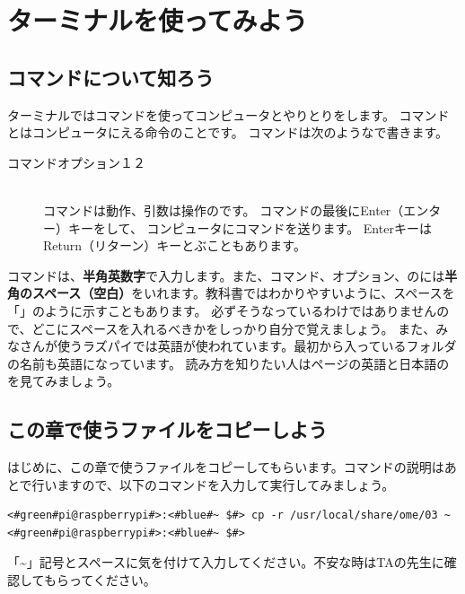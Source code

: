 \documentclass[text03.tex]{subfiles}
\begin{document}
\section{ターミナルを使ってみよう}
\subsection{コマンドについて知ろう}

ターミナルではコマンドを使ってコンピュータとやりとりをします。
コマンドとはコンピュータにえる命令のことです。
コマンドは次のようなで書きます。

\begin{description}
\item[コマンド\textvisiblespace オプション\textvisiblespace {}１\textvisiblespace{}２]\mbox{}\\
コマンドは動作、引数は操作のです。
 コマンドの最後にEnter（エンター）キーをして、
 コンピュータにコマンドを送ります。
 EnterキーはReturn（リターン）キーとぶこともあります。
\end{description}

コマンドは、{\bf 半角英数字}で入力します。また、コマンド、オプション、のには{\bf 半角のスペース（空白）}をいれます。教科書ではわかりやすいように、スペースを「\textvisiblespace 」のように示すこともあります。
必ずそうなっているわけではありませんので、どこにスペースを入れるべきかをしっかり自分で覚えましょう。
また、みなさんが使うラズパイでは英語が使われています。最初から入っているフォルダの名前も英語になっています。
読み方を知りたい人は\pageref{英語と日本語の対応表}ページの英語と日本語のを見てみましょう。

\subsection{この章で使うファイルをコピーしよう}
はじめに、この章で使うファイルをコピーしてもらいます。コマンドの説明はあとで行いますので、以下のコマンドを入力して実行してみましょう。
\begin{lstlisting}[caption=使うファイルのコピー,label=workfilecopy]
<#green#pi@raspberrypi#>:<#blue#~ $#> cp -r /usr/local/share/ome/03 ~
<#green#pi@raspberrypi#>:<#blue#~ $#>
\end{lstlisting}
「\textasciitilde 」記号とスペースに気を付けて入力してください。不安な時はTAの先生に確認してもらってください。
\end{document}
